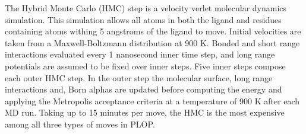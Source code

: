 The Hybrid Monte Carlo (HMC) \cite{duane1987hybrid} step is a velocity verlet molecular dynamics simulation.
This simulation allows all atoms in both the ligand and residues containing atoms withing 5 angstroms of the ligand to move.
Initial velocities are taken from a Maxwell-Boltzmann distribution at 900 K.
Bonded and short range interactions evaluated every 1 nanosecond inner time step, and long range potentials are assumed to be fixed over inner steps.
Five inner steps compose each outer HMC step.
In the outer step the molecular surface, long range interactions and, Born alphas are updated before computing the energy and applying the Metropolis acceptance criteria at a temperature of 900 K after each MD run.
Taking up to 15 minutes per move, the HMC is the most expensive among all three types of moves in PLOP.




